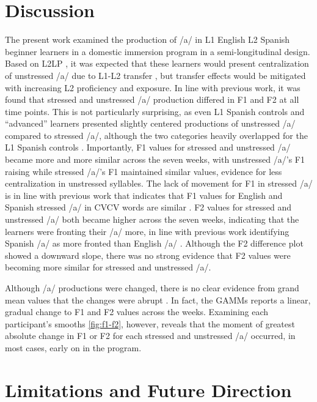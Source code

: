 \documentclass[
  a4paper,
  11pt,
  twocolumn]{article}
\begin{document}
\section{Discussion}

The present work examined the production of /a/ in L1 English L2 Spanish
beginner learners in a domestic immersion program in a semi-longitudinal
design. Based on L2LP
\cite{escudero2004bridging,escudero2005linguistic,escudero2007second,escudero2009linguistic,van2015learning},
it was expected that these learners would present centralization of
unstressed /a/ due to L1-L2 transfer
\cite{bybee2003phonology,cobb2009pronunciacion,cobb2015adult}, but
transfer effects would be mitigated with increasing L2 proficiency and
exposure. In line with previous work, it was found that stressed and
unstressed /a/ production differed in F1 and F2 at all time points. This
is not particularly surprising, as even L1 Spanish controls and
``advanced'' learners presented slightly centered productions of
unstressed /a/ compared to stressed /a/, although the two categories
heavily overlapped for the L1 Spanish controls \cite{cobb2015adult}.
Importantly, F1 values for stressed and unstressed /a/ became more and
more similar across the seven weeks, with unstressed /a/'s F1 raising
while stressed /a/'s F1 maintained similar values, evidence for less
centralization in unstressed syllables. The lack of movement for F1 in
stressed /a/ is in line with previous work that indicates that F1 values
for English and Spanish stressed /a/ in CVCV words are similar
\cite{bradlow1995comparative}. F2 values for stressed and unstressed /a/
both became higher across the seven weeks, indicating that the learners
were fronting their /a/ more, in line with previous work identifying
Spanish /a/ as more fronted than English /a/
\cite{bradlow1995comparative}. Although the F2 difference plot showed a
downward slope, there was no strong evidence that F2 values were
becoming more similar for stressed and unstressed /a/.

Although /a/ productions were changed, there is no clear evidence from
grand mean values that the changes were abrupt
\cite{casillas2020phonetic}. In fact, the GAMMs reports a linear,
gradual change to F1 and F2 values across the weeks. Examining each
participant's smooths \ref{fig:f1-f2}, however, reveals that the moment
of greatest absolute change in F1 or F2 for each stressed and unstressed
/a/ occurred, in most cases, early on in the program.

\section{Limitations and Future Direction}
\end{document}
